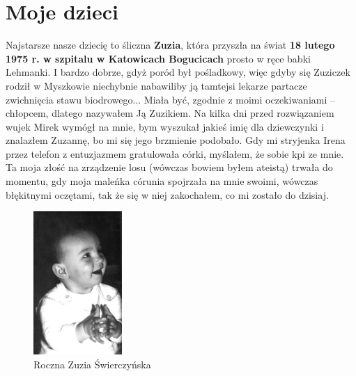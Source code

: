 \clearpage
\section{Moje dzieci}

Najstarsze nasze dziecię to śliczna \textbf{Zuzia}, która przyszła na świat \textbf{18 lutego 1975 r. w szpitalu w Katowicach Bogucicach} prosto w ręce babki Lehmanki. I bardzo dobrze, gdyż poród był pośladkowy, więc gdyby się Zuziczek rodził w Myszkowie niechybnie nabawiliby ją tamtejsi lekarze partacze zwichnięcia stawu biodrowego... Miała być, zgodnie z moimi oczekiwaniami – chłopcem, dlatego nazywałem Ją Zuzikiem. Na kilka dni przed rozwiązaniem wujek Mirek wymógł na mnie, bym wyszukał jakieś imię dla dziewczynki i znalazłem Zuzannę, bo mi się jego brzmienie podobało. Gdy mi stryjenka Irena przez telefon z entuzjazmem gratulowała córki, myślałem, że sobie kpi ze mnie. Ta moja złość na zrządzenie losu (wówczas bowiem byłem ateistą) trwała do momentu, gdy moja maleńka córunia spojrzała na mnie swoimi, wówczas błękitnymi oczętami, tak że się w niej zakochałem, co mi zostało do dzisiaj.

\begin{figure}[!h]
\begin{center}
\includegraphics[width=0.3\textwidth]{photo/zuzia_swierczynska_2.jpg}
\caption{Roczna Zuzia Świerczyńska}
\end{center}
\end{figure}

